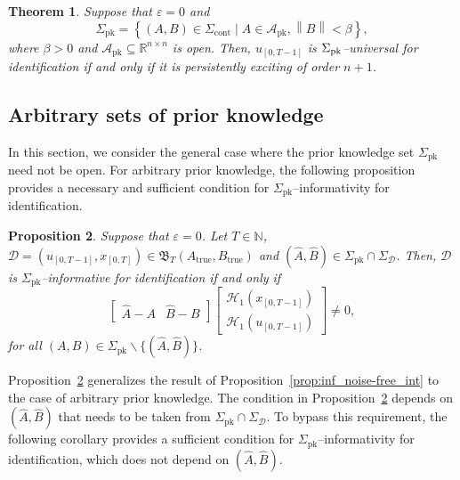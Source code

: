 \documentclass[journal,twoside,web]{ieeecolor}
\newcommand{\set}[2]{\left\{#1 \mid #2\right\}}
\newcommand{\norm}[1]{\left\|#1\right\|}
\newtheorem{theorem}{Theorem}
\newtheorem{proposition}[theorem]{Proposition}
\begin{document}
\begin{theorem}
\label{th:PE_nec_ball}
Suppose that $\varepsilon=0$ and
\begin{equation}
\Sigma_\text{pk}=\set{(A,B)\in\Sigma_\text{cont}}{A\in\mathcal{A}_\text{pk},\norm{B}< \beta},
\end{equation}
where $\beta>0$ and $\mathcal{A}_\text{pk}\subseteq\mathbb{R}^{n\times n}$ is open. Then, $u_{[0,T-1]}$ is $\Sigma_\textup{pk}$--universal for identification \emph{if and only if} it is persistently exciting of order $n+1$. 
\end{theorem}


\subsection{Arbitrary sets of prior knowledge}
\label{sec:noise-free_arbitrary}

In this section, we consider the general case where the prior knowledge set $\Sigma_\text{pk}$ need not be open. For arbitrary prior knowledge, the following proposition provides a necessary and sufficient condition for $\Sigma_\text{pk}$--informativity for identification.

\begin{proposition}
\label{prop:data_best}
Suppose that $\varepsilon=0$. Let $T\in\mathbb{N}$, \linebreak$\mathcal{D}\!=\!(u_{[0,T-1]},x_{[0,T]})\!\in\!\mathfrak{B}_T(A_\text{true},\!B_\text{true})$ and $(\hat{A},\!\hat{B})\!\in\!\Sigma_\text{pk}\cap\Sigma_\mathcal{D}$. Then, $\mathcal{D}$ is $\Sigma_\text{pk}$--informative for identification \emph{if and only if}
\begin{equation}
\label{eq:rank_data_gen}
\begin{bmatrix}
\hat{A}-A & \hat{B}-B
\end{bmatrix}\begin{bmatrix}
\mathcal{H}_1(x_{[0,T-1]}) \\
\mathcal{H}_1(u_{[0,T-1]})
\end{bmatrix}\neq 0,
\end{equation}
for all $(A,B)\in\Sigma_\text{pk}\backslash\{(\hat{A},\hat{B})\}$.
\end{proposition}


Proposition~\ref{prop:data_best} generalizes the result of Proposition~\ref{prop:inf_noise-free_int} to the case of arbitrary prior knowledge. The condition in Proposition~\ref{prop:data_best} depends on $(\hat{A},\hat{B})$ that needs to be taken from $\Sigma_\text{pk}\cap\Sigma_\mathcal{D}$. To bypass this requirement, the following corollary provides a sufficient condition for $\Sigma_\text{pk}$--informativity for identification, which does not depend on $(\hat{A},\hat{B})$. 
\end{document}
